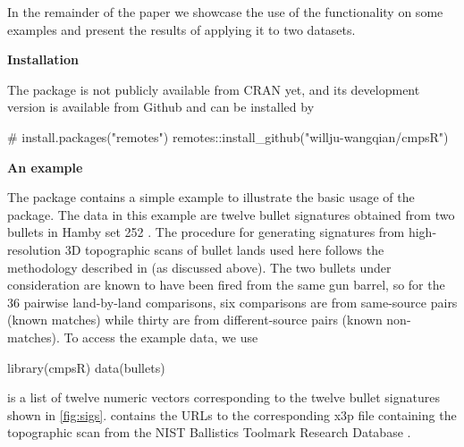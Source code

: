 In the remainder of the paper we showcase the use of the 
functionality on some examples and present the results of applying it to
two datasets.

\textbf{Installation}

The  package is not publicly available from CRAN yet, and its
development version is available from Github and can be installed by

\begin{Schunk}
\begin{Sinput}
# install.packages("remotes") 
remotes::install_github("willju-wangqian/cmpsR")
\end{Sinput}
\end{Schunk}

\textbf{An example}

The  package contains a simple example to illustrate the
basic usage of the package. The data in this example are twelve bullet
signatures obtained from two bullets in Hamby set 252 \citep{hamby}. The
procedure for generating signatures from high-resolution 3D topographic
scans of bullet lands used here follows the methodology described in
\citet{aoas} (as discussed above). The two bullets under consideration
are known to have been fired from the same gun barrel, so for the 36
pairwise land-by-land comparisons, six comparisons are from same-source
pairs (known matches) while thirty are from different-source pairs
(known non-matches). To access the example data, we use

\begin{Schunk}
\begin{Sinput}
library(cmpsR)
data(bullets)
\end{Sinput}
\end{Schunk}

 is a list of twelve numeric vectors corresponding
to the twelve bullet signatures shown in \autoref{fig:sigs}.
 contains the URLs to the corresponding x3p file
containing the topographic scan from the NIST Ballistics Toolmark
Research Database \citep{nistdb}.

